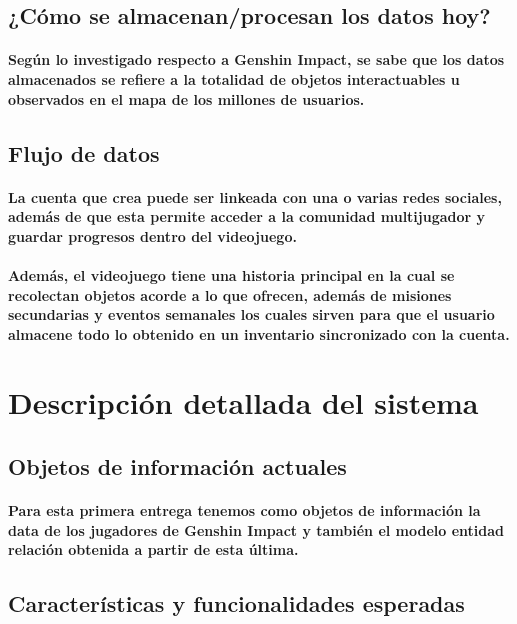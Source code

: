 \documentclass{report}
\begin{document}
\subsection{¿Cómo se almacenan/procesan los datos hoy?}
\paragraph{Según lo investigado respecto a Genshin Impact, se sabe que los datos almacenados se refiere a la totalidad de objetos interactuables u observados en el mapa de los millones de usuarios.}
\subsection{Flujo de datos}
\paragraph{La cuenta que crea puede ser linkeada con una o varias redes sociales, además de que esta permite acceder a la comunidad multijugador y guardar progresos dentro del videojuego.}
\paragraph{Además, el videojuego tiene una historia principal en la cual se recolectan objetos acorde a lo que ofrecen, además de misiones secundarias y eventos semanales los cuales sirven para que el usuario almacene todo lo obtenido en un inventario sincronizado con la cuenta.}

\section{Descripción detallada del sistema}
\subsection{Objetos de información actuales}
\paragraph{Para esta primera entrega tenemos como objetos de información la data de los jugadores de Genshin Impact y también el modelo entidad relación obtenida a partir de esta última.}

\subsection{Características y funcionalidades esperadas}
\end{document}
